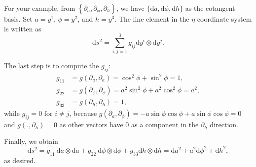 \documentclass{article}
\begin{document}
For your example, from $\left\{\partial_a, \partial_\phi, \partial_h\right\}$, we have $\{\mathrm{d}a, \mathrm{d}\phi, \mathrm{d}h\}$ as the cotangent basis. Set $a = y^{1}$, $\phi = y^{2}$, and $h = y^{3}$. The line element in the $\eta$ coordinate system is written as 
\[
\mathrm{d}s^{2} = \sum_{i,j = 1}^{3} g_{ij} \mathrm{d}y^{i} \otimes \mathrm{d}y^{j}.
\]

The last step is to compute the $g_{ij}$:
\[
\begin{aligned}
    g_{11} &= g(\partial_a, \partial_a) = \cos^{2}\phi + \sin^{2}\phi = 1, \\
    g_{22} &= g(\partial_\phi, \partial_\phi) = a^{2}\sin^{2}\phi + a^{2}\cos^{2}\phi = a^{2}, \\
    g_{33} &= g(\partial_h, \partial_h) = 1,
\end{aligned}
\]
while $g_{ij} = 0$ for $i \neq j$, because $g(\partial_a,\partial_\phi) = -a\sin\phi\cos\phi + a\sin\phi\cos\phi = 0$ and $g(.,\partial_h) = 0$ as other vectors have $0$ as a component in the $\partial_h$ direction.

Finally, we obtain
\[
    \mathrm{d}s^{2} = g_{11} \ \mathrm{d}a \otimes \mathrm{d}a + g_{22} \ \mathrm{d}\phi \otimes \mathrm{d}\phi + g_{33} \mathrm{d}h \otimes \mathrm{d}h = \mathrm{d}a^{2} + a^{2}\mathrm{d}\phi^{2} + \mathrm{d}h^{2},
\]
as desired.
\end{document}
